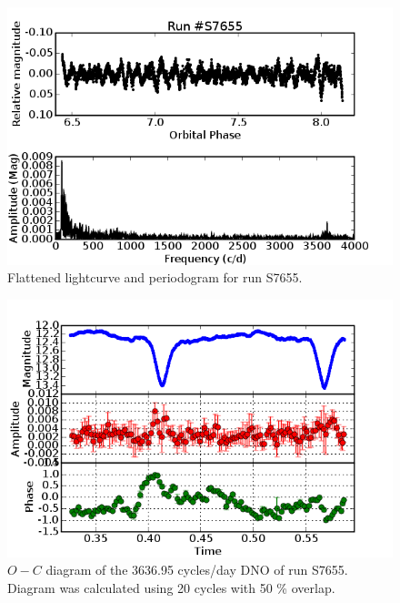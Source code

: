 

\begin{figure}
 \centering
 \includegraphics[width = 0.8\columnwidth, bb=0 0 600 400]{images/S7655.png}
 \caption{Flattened lightcurve and periodogram for run S7655.}
 \label{S7655}
\end{figure}

\begin{figure}
 \centering
 \includegraphics[width = 0.8\columnwidth, bb=0 0 600 400]{images/run2_flat.png}
 \caption[$O-C$ diagram of the 3636.95 cycles/day DNO of run S7655.]{$O-C$ diagram of the 3636.95 cycles/day DNO of run S7655. Diagram was calculated using 20 cycles with 50 \% overlap.}
 \label{OC_S7655}
\end{figure}

